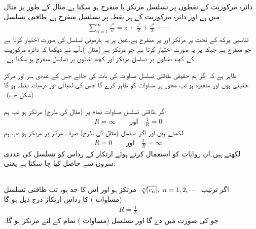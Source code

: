 دائرہ مرکوزیت کے نقطوں پر تسلسل مرتکز یا منفرج ہو سکتا ہے۔مثال کے طور پر مثال   میں  ہے اور دائرہ مرکوزیت  کے ہر نقطہ پر  تسلسل منفرج ہے۔طاقتی تسلسل
\begin{align*}
\sum\limits_{n=1}^{\infty} \frac{z^n}{n}=z+\frac{z^2}{2}+\frac{z^3}{3}+\cdots
\end{align*}
تناسبی پرکھ کے تحت  پر مرتکز اور  پر منفرج ہے۔عین  پر یہ ہارمونی تسلسل کی صورت اختیار کرتا ہے جو منفرج ہے جبکہ  پر یہ  صورت اختیار کرتا ہے جو مرتکز ہے (مثال )۔آپ نے دیکھا کہ دائرہ مرکوزیت کے کچھ نقطوں پر تسلسل مرتکز اور کچھ نقطوں پر تسلسل منفرج ہو سکتا ہے۔

ظاہر ہے کہ اگر ہم حقیقی طاقتی تسلسل مساوات  کی بات کی جائے جس کے عددی سر اور مرکز حقیقی ہوں اور  متغیرہ  ہو تب  محور پر  مساوات    کو ظاہر کرے گا جس کی لمبائی  اور درمیانہ نقطہ  ہو گا (شکل -ب)۔

اگر طاقتی تسلسل مساوات  تمام  پر (مثال  کی طرح) مرتکز ہو تب ہم
\begin{align*}
R=\infty\quad \quad \text{اور}\quad \frac{1}{R}=0
\end{align*} 
لکھتے ہیں اور اگر تسلسل (مثال  کی طرح) صرف مرکز  پر مرتکز ہو تب ہم
\begin{align*}
R=0\quad \quad \text{اور}\quad \frac{1}{R}=\infty
\end{align*}
لکھتے ہیں۔ان روایات کو استعمال کرتے ہوئے ارتکاز کے رداس  کو تسلسل کی عددی سروں سے حاصل کیا جا سکتا ہے یعنی:

\quad {}\\
اگر ترتیب
$\,\sqrt[\leftroot{-2}n]{\abs{c_n}},\,\, n=1,2,\cdots\,$
مرتکز ہو اور اس کا حد  ہو، تب طاقتی تسلسل (مساوات ) کا رداس ارتکاز  درج ذیل ہو گا
\begin{align}\label{مساوات_ٹیلر_رداس_ارتکاز_الف}
R=\frac{1}{L}
\end{align}
جو  کی صورت میں  دے گا اور تسلسل  (مساوات ) تمام  کے لئے مرتکز ہو گا۔

